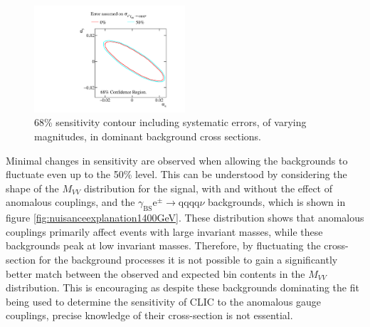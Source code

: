 \begin{figure}[h!]
\centering
\includegraphics[width=0.5\textwidth]{PhysicsAnalysis/Plots/NuisanceFit/1400GeV/Nuisance.pdf}
\caption[68\% sensitivity contour including systematic errors, of varying magnitudes, in dominant background cross sections.]{68\% sensitivity contour including systematic errors, of varying magnitudes, in dominant background cross sections.}
\label{fig:nuisance1400GeV}
\end{figure}

Minimal changes in sensitivity are observed when allowing the backgrounds to fluctuate even up to the 50\% level.  This can be understood by considering the shape of the $M_{VV}$ distribution for the signal, with and without the effect of anomalous couplings, and the $\gamma_{\text{BS}}\text{e}^{\pm} \rightarrow \text{qqqq}\nu$ backgrounds, which is shown in figure \ref{fig:nuisanceexplanation1400GeV}.  These distribution shows that anomalous couplings primarily affect events with large invariant masses, while these backgrounds peak at low invariant masses.  Therefore, by fluctuating the cross-section for the background processes it is not possible to gain a significantly better match between the observed and expected bin contents in the $M_{VV}$ distribution.  This is encouraging as despite these backgrounds dominating the fit being used to determine the sensitivity of CLIC to the anomalous gauge couplings, precise knowledge of their cross-section is not essential.

